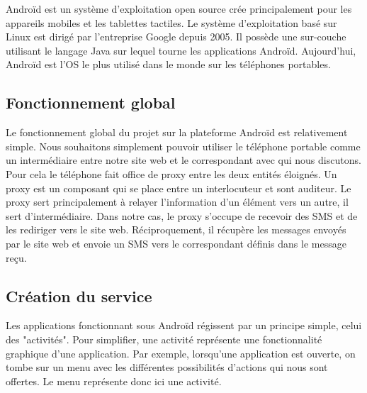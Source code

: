 Androïd est un système d'exploitation open source crée principalement pour les appareils mobiles et 
les tablettes tactiles. Le système d'exploitation basé sur Linux est dirigé par l'entreprise Google
depuis 2005. Il possède une sur-couche utilisant le langage Java sur lequel tourne les applications 
Androïd.
Aujourd'hui, Androïd est l'OS le plus utilisé dans le monde sur les téléphones portables.
\\



\subsection{Fonctionnement global}



Le fonctionnement global du projet sur la plateforme Androïd est relativement simple. Nous souhaitons
simplement pouvoir utiliser le téléphone portable comme un intermédiaire entre notre site web et le 
correspondant avec qui nous discutons. Pour cela le téléphone fait office de proxy entre les deux 
entités éloignés. Un proxy est un composant qui se place entre un interlocuteur et sont auditeur. Le 
proxy sert principalement à relayer l'information d'un élément vers un autre, il sert d'intermédiaire.
Dans notre cas, le proxy s'occupe de recevoir des SMS et de les rediriger vers le site web. 
Réciproquement, il récupère les messages envoyés par le site web et envoie un SMS vers le correspondant
définis dans le message reçu.
\\



\subsection{Création du service}



Les applications fonctionnant sous Androïd régissent par un principe simple, celui des "activités".
Pour simplifier, une activité représente une fonctionnalité graphique d'une application. Par exemple,
lorsqu'une application est ouverte, on tombe sur un menu avec les différentes possibilités d'actions 
qui nous sont offertes. Le menu représente donc ici une activité.
\\


